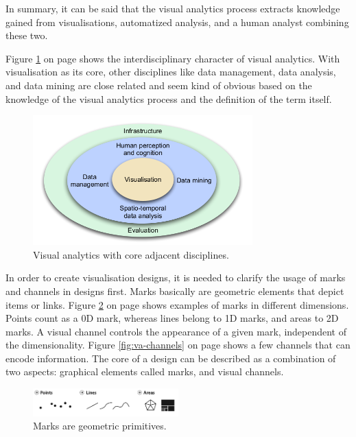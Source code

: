 In summary, it can be said that the visual analytics process extracts knowledge gained from visualisations, automatized analysis, and a human analyst combining these two.

Figure \ref{fig:va-related} on page \pageref{fig:va-related} shows the interdisciplinary character of visual analytics. With visualisation as its core, other disciplines like data management, data analysis, and data mining are close related and seem kind of obvious based on the knowledge of the visual analytics process and the definition of the term itself.

\begin{figure}[!htb]
\centering
\includegraphics[height=5cm,keepaspectratio]{images/va/va-related.png}
\caption[
    Visual analytics with core adjacent disciplines .
]{Visual analytics with core adjacent disciplines.}
\label{fig:va-related}
\end{figure}

In order to create visualisation designs, it is needed to clarify the usage of marks and channels in designs first. Marks basically are geometric elements that depict items or links. Figure \ref{fig:va-marks} on page \pageref{fig:va-marks} shows examples of marks in different dimensions. Points count as a 0D mark, whereas lines belong to 1D marks, and areas to 2D marks. A visual channel controls the appearance of a given mark, independent of the dimensionality. Figure \ref{fig:va-channels} on page \pageref{fig:va-channels} shows a few channels that can encode information. The core of a design can be described as a combination of two aspects: graphical elements called marks, and visual channels.

\begin{figure}[!htb]
\centering
\includegraphics[width=0.5\textwidth,keepaspectratio]{images/va/marks.png}
\caption[
    Marks are geometric primitives .
]{Marks are geometric primitives.}
\label{fig:va-marks}
\end{figure}

